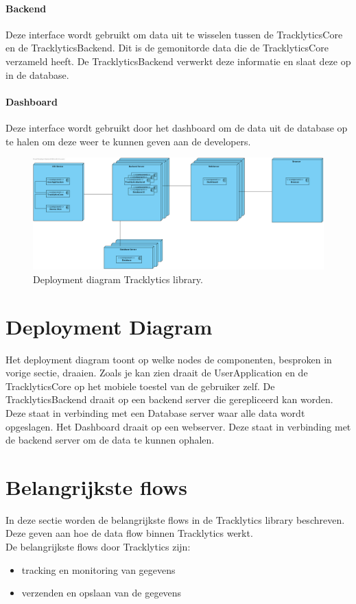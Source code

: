 \paragraph{Backend}
Deze interface wordt gebruikt om data uit te wisselen tussen de TracklyticsCore en de TracklyticsBackend. Dit is de gemonitorde data die de TracklyticsCore verzameld heeft. De TracklyticsBackend verwerkt deze informatie en slaat deze op in de database.\\

\paragraph{Dashboard}
Deze interface wordt gebruikt door het dashboard om de data uit de database op te halen om deze weer te kunnen geven aan de developers. 





\begin{figure}[!h]
  \centering
  \includegraphics[scale=0.30]{Afbeeldingen/Architectuur/Deployment}
  \caption{Deployment diagram Tracklytics library.}
  \label{fig:deployment}
\end{figure}
\section{Deployment Diagram}
Het deployment diagram toont op welke nodes de componenten, besproken in vorige sectie, draaien. Zoals je kan zien draait de UserApplication en de TracklyticsCore op het mobiele toestel van de gebruiker zelf. De TracklyticsBackend draait op een backend server die gerepliceerd kan worden. Deze staat in verbinding met een Database server waar alle data wordt opgeslagen. Het Dashboard draait op een webserver. Deze staat in verbinding met de backend server om de data te kunnen ophalen.

\section{Belangrijkste flows}
In deze sectie worden de belangrijkste flows in de Tracklytics library beschreven. Deze geven aan hoe de data flow binnen Tracklytics werkt.\\
De belangrijkste flows door Tracklytics zijn:
\begin{itemize}
\item tracking en monitoring van gegevens
\item verzenden en opslaan van de gegevens
\end{itemize} 


